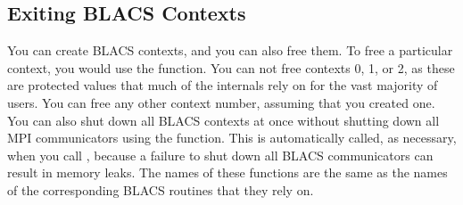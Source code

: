 \subsection[]{Exiting BLACS Contexts}
\label{sec:ictxt}

You can create BLACS contexts, and you can also free them.  To free a particular context, you would use the  function.  You can not free contexts 0, 1, or 2, as these are protected values that much of the internals rely on for the vast majority of users.  You can free any other context number, assuming that you created one.
\np
You can also shut down all BLACS contexts at once without shutting down all MPI communicators using the  function.  This is automatically called, as necessary, when you call , because a failure to shut down all BLACS communicators can result in memory leaks.
\np
The names of these functions are the same as the names of the corresponding BLACS routines that they rely on.





